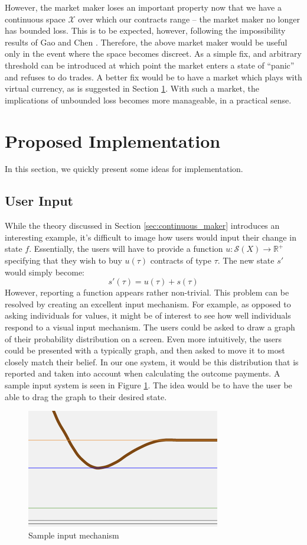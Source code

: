However, the market maker loses an important property now that we have a continuous space $\mathcal{X}$ over which our contracts range -- the market maker no longer has bounded loss. This is to be expected, however, following the impossibility results of Gao and Chen \cite{impossible}. Therefore, the above market maker would be useful only in the event where the space becomes discreet. As a simple fix, and arbitrary threshold can be introduced at which point the market enters a state of ``panic'' and refuses to do trades. A better fix would be to have a market which plays with virtual currency, as is suggested in Section \ref{sec:implementation}. With such a market, the implications of unbounded loss becomes more manageable, in a practical sense.

\section{Proposed Implementation}
\label{sec:implementation}
In this section, we quickly present some ideas for implementation.

\subsection{User Input}
While the theory discussed in Section \ref{sec:continuous_maker} introduces an interesting example, it's difficult to image how users would input their change in state $f$. Essentially, the users will have to provide a function $u:\mathcal{S}(X) \to \mathbb{R}^+$ specifying that they wish to buy $u(\tau)$ contracts of type $\tau$. The new state $s'$ would simply become:
\[
s'(\tau) = u(\tau) + s(\tau)
\]
However, reporting a function appears rather non-trivial. This problem can be resolved by creating an excellent input mechanism. For example, as opposed to asking individuals for values, it might be of interest to see how well individuals respond to a visual input mechanism. The users could be asked to draw a graph of their probability distribution on a screen. Even more intuitively, the users could be presented with a typically graph, and then asked to move it to most closely match their belief. In our one system, it would be this distribution that is reported and taken into account when calculating the outcome payments. A sample input system is seen in Figure \ref{fig:dist}. The idea would be to have the user be able to drag the graph to their desired state.

\begin{figure}
\centering

\includegraphics[scale=0.5]{dist}
\caption{Sample input mechanism}
\label{fig:dist}
\end{figure}

